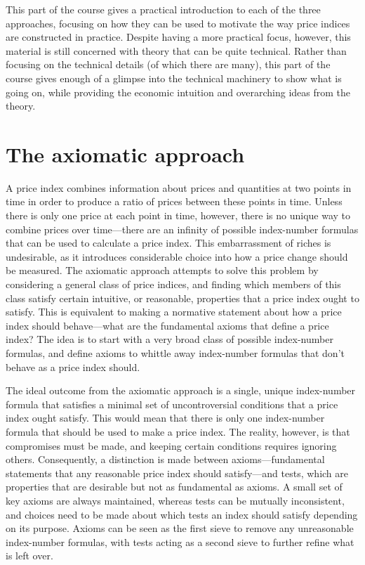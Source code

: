 \documentclass[
]{article}
\begin{document}
This part of the course gives a practical introduction to each of the three approaches, focusing on how they can be used to motivate the way price indices are constructed in practice. Despite having a more practical focus, however, this material is still concerned with theory that can be quite technical. Rather than focusing on the technical details (of which there are many), this part of the course gives enough of a glimpse into the technical machinery to show what is going on, while providing the economic intuition and overarching ideas from the theory.

\hypertarget{the-axiomatic-approach}{%
\section{The axiomatic approach}\label{the-axiomatic-approach}}

A price index combines information about prices and quantities at two points in time in order to produce a ratio of prices between these points in time. Unless there is only one price at each point in time, however, there is no unique way to combine prices over time---there are an infinity of possible index-number formulas that can be used to calculate a price index. This embarrassment of riches is undesirable, as it introduces considerable choice into how a price change should be measured. The axiomatic approach attempts to solve this problem by considering a general class of price indices, and finding which members of this class satisfy certain intuitive, or reasonable, properties that a price index ought to satisfy. This is equivalent to making a normative statement about how a price index should behave---what are the fundamental axioms that define a price index? The idea is to start with a very broad class of possible index-number formulas, and define axioms to whittle away index-number formulas that don't behave as a price index should.

The ideal outcome from the axiomatic approach is a single, unique index-number formula that satisfies a minimal set of uncontroversial conditions that a price index ought satisfy. This would mean that there is only one index-number formula that should be used to make a price index. The reality, however, is that compromises must be made, and keeping certain conditions requires ignoring others. Consequently, a distinction is made between axioms---fundamental statements that any reasonable price index should satisfy---and tests, which are properties that are desirable but not as fundamental as axioms. A small set of key axioms are always maintained, whereas tests can be mutually inconsistent, and choices need to be made about which tests an index should satisfy depending on its purpose. Axioms can be seen as the first sieve to remove any unreasonable index-number formulas, with tests acting as a second sieve to further refine what is left over.
\end{document}

